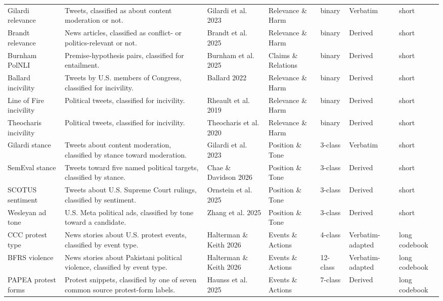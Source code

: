 \begin{longtable}[t]{l>{\raggedright\arraybackslash}p{18em}>{\raggedright\arraybackslash}p{7em}>{\raggedright\arraybackslash}p{8em}lll}
\endfoot
\bottomrule
\endlastfoot
Gilardi relevance & Tweets, classified as about content moderation or not. & Gilardi et al. 2023 & Relevance \& Harm & binary & Verbatim & short\\
Brandt relevance & News articles, classified as conflict- or politics-relevant or not. & Brandt et al. 2025 & Relevance \& Harm & binary & Derived & short\\
Burnham PolNLI & Premise-hypothesis pairs, classified for entailment. & Burnham et al. 2025 & Claims \& Relations & binary & Derived & short\\
Ballard incivility & Tweets by U.S. members of Congress, classified for incivility. & Ballard 2022 & Relevance \& Harm & binary & Derived & short\\
Line of Fire incivility & Political tweets, classified for incivility. & Rheault et al. 2019 & Relevance \& Harm & binary & Derived & short\\
\addlinespace
Theocharis incivility & Political tweets, classified for incivility. & Theocharis et al. 2020 & Relevance \& Harm & binary & Derived & short\\
Gilardi stance & Tweets about content moderation, classified by stance toward moderation. & Gilardi et al. 2023 & Position \& Tone & 3-class & Verbatim & short\\
SemEval stance & Tweets toward five named political targets, classified by stance. & Chae \& Davidson 2026 & Position \& Tone & 3-class & Derived & short\\
SCOTUS sentiment & Tweets about U.S. Supreme Court rulings, classified by sentiment. & Ornstein et al. 2025 & Position \& Tone & 3-class & Derived & short\\
Wesleyan ad tone & U.S. Meta political ads, classified by tone toward a candidate. & Zhang et al. 2025 & Position \& Tone & 3-class & Derived & short\\
\addlinespace
CCC protest type & News stories about U.S. protest events, classified by event type. & Halterman \& Keith 2026 & Events \& Actions & 4-class & Verbatim-adapted & long codebook\\
BFRS violence & News stories about Pakistani political violence, classified by event type. & Halterman \& Keith 2026 & Events \& Actions & 12-class & Verbatim-adapted & long codebook\\
PAPEA protest forms & Protest snippets, classified by one of seven common source protest-form labels. & Haunss et al. 2025 & Events \& Actions & 7-class & Derived & long codebook\\

\end{longtable}
